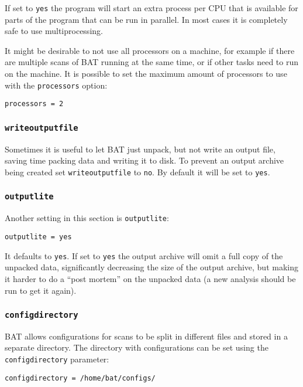 \documentclass[10pt,a4paper]{article}
\begin{document}
If set to \texttt{yes} the program will start an extra process per CPU that is
available for parts of the program that can be run in parallel. In most cases
it is completely safe to use multiprocessing.

It might be desirable to not use all processors on a machine, for example if
there are multiple scans of BAT running at the same time, or if other tasks
need to run on the machine. It is possible to set the maximum amount of
processors to use with the \texttt{processors} option:

\begin{verbatim}
processors = 2
\end{verbatim}

\subsubsection{\texttt{writeoutputfile}}

Sometimes it is useful to let BAT just unpack, but not write an output file,
saving time packing data and writing it to disk. To prevent an output archive
being created set \texttt{writeoutputfile} to \texttt{no}. By default it will
be set to \texttt{yes}.

\subsubsection{\texttt{outputlite}}

Another setting in this section is \texttt{outputlite}:

\begin{verbatim}
outputlite = yes
\end{verbatim}

It defaults to \texttt{yes}. If set to \texttt{yes} the output archive will omit
a full copy of the unpacked data, significantly decreasing the size of the
output archive, but making it harder to do a ``post mortem'' on the unpacked
data (a new analysis should be run to get it again).

\subsubsection{\texttt{configdirectory}}

BAT allows configurations for scans to be split in different files and stored
in a separate directory. The directory with configurations can be set using the
\texttt{configdirectory} parameter:

\begin{verbatim}
configdirectory = /home/bat/configs/
\end{verbatim}
\end{document}
